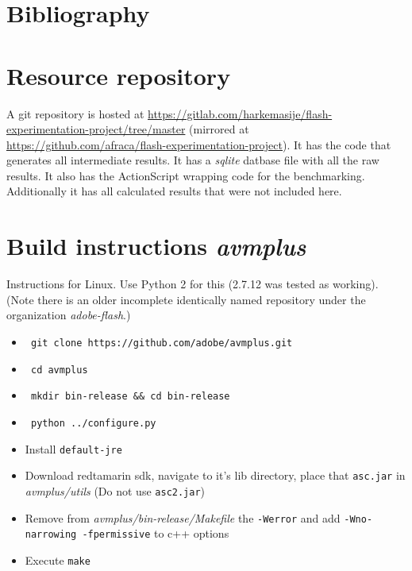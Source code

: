 \documentclass[a4paper,11pt]{scrartcl}
\begin{document}
\newpage

\section{Bibliography}



\appendix

\section{Resource repository}
\label{sec:resources}

A git repository is hosted at \url{https://gitlab.com/harkemasije/flash-experimentation-project/tree/master} (mirrored at \url{https://github.com/afraca/flash-experimentation-project}). It has the code that generates all intermediate results. It has a \textit{sqlite} datbase file with all the raw results. It also has the ActionScript wrapping code for the benchmarking. Additionally it has all calculated results that were not included here.


\section{Build instructions \textit{avmplus}}
\label{sec:buildavmplus}

Instructions for Linux. Use Python 2 for this (2.7.12 was tested as working). (Note there is an older incomplete identically named repository under the organization \textit{adobe-flash}.)

\begin{itemize}
\item \begin{verbatim} git clone https://github.com/adobe/avmplus.git \end{verbatim} 
\item \begin{verbatim} cd avmplus \end{verbatim}
\item \begin{verbatim} mkdir bin-release && cd bin-release \end{verbatim}
\item \begin{verbatim} python ../configure.py \end{verbatim}
\item Install \texttt{default-jre} 
\item Download redtamarin sdk, navigate to it's lib directory, place that \texttt{asc.jar} in \textit{avmplus/utils} (Do not use \texttt{asc2.jar})
\item Remove from \textit{avmplus/bin-release/Makefile} the \texttt{-Werror} and add \texttt{-Wno-narrowing -fpermissive} to c++ options
\item Execute \texttt{make}
\end{itemize}
\end{document}
